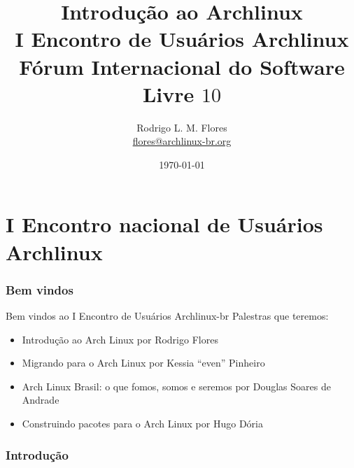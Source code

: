 \documentclass{beamer}
\title{Introdução ao Archlinux\\I Encontro de Usuários Archlinux\\Fórum Internacional do Software Livre $10$}
\author{Rodrigo L. M. Flores \\ \url{flores@archlinux-br.org}}
\institute{Projeto Archlinux-BR}
\begin{document}
\date{\today}

\frame{\titlepage}
\section{I Encontro nacional de Usuários Archlinux}


\begin{frame}
    \frametitle{Bem vindos}
    \begin{block}{Bem vindos ao I Encontro de Usuários Archlinux-br}
        Palestras que teremos:
        \begin{itemize}
            \item<1-> Introdução ao Arch Linux por Rodrigo Flores
            \item<2-> Migrando para o Arch Linux por Kessia ``even'' Pinheiro
            \item<3-> Arch Linux Brasil: o que fomos, somos e seremos por Douglas Soares de Andrade
            \item<4-> Construindo pacotes para o Arch Linux por Hugo Dória
        \end{itemize}
    \end{block}
\end{frame}


\begin{frame}
    \frametitle{Introdução}
\end{frame}











\end{document}
